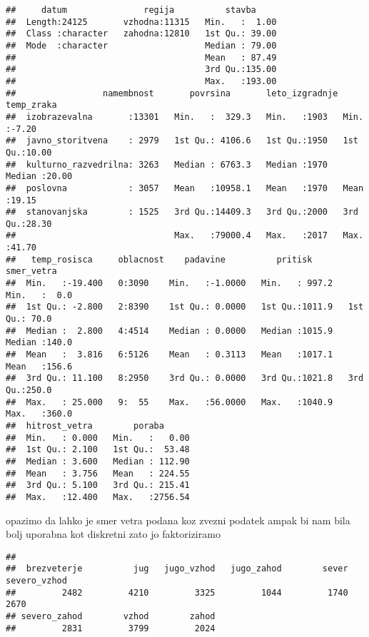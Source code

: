 \documentclass[
]{article}
\newenvironment{Shaded}{\begin{snugshade}}{\end{snugshade}}
\newcommand{\FunctionTok}[1]{\textcolor[rgb]{0.00,0.00,0.00}{#1}}
\newcommand{\NormalTok}[1]{#1}
\newcommand{\SpecialCharTok}[1]{\textcolor[rgb]{0.00,0.00,0.00}{#1}}
\begin{document}
\begin{verbatim}
##     datum               regija          stavba      
##  Length:24125       vzhodna:11315   Min.   :  1.00  
##  Class :character   zahodna:12810   1st Qu.: 39.00  
##  Mode  :character                   Median : 79.00  
##                                     Mean   : 87.49  
##                                     3rd Qu.:135.00  
##                                     Max.   :193.00  
##                 namembnost       povrsina       leto_izgradnje   temp_zraka   
##  izobrazevalna       :13301   Min.   :  329.3   Min.   :1903   Min.   :-7.20  
##  javno_storitvena    : 2979   1st Qu.: 4106.6   1st Qu.:1950   1st Qu.:10.00  
##  kulturno_razvedrilna: 3263   Median : 6763.3   Median :1970   Median :20.00  
##  poslovna            : 3057   Mean   :10958.1   Mean   :1970   Mean   :19.15  
##  stanovanjska        : 1525   3rd Qu.:14409.3   3rd Qu.:2000   3rd Qu.:28.30  
##                               Max.   :79000.4   Max.   :2017   Max.   :41.70  
##   temp_rosisca     oblacnost    padavine          pritisk         smer_vetra   
##  Min.   :-19.400   0:3090    Min.   :-1.0000   Min.   : 997.2   Min.   :  0.0  
##  1st Qu.: -2.800   2:8390    1st Qu.: 0.0000   1st Qu.:1011.9   1st Qu.: 70.0  
##  Median :  2.800   4:4514    Median : 0.0000   Median :1015.9   Median :140.0  
##  Mean   :  3.816   6:5126    Mean   : 0.3113   Mean   :1017.1   Mean   :156.6  
##  3rd Qu.: 11.100   8:2950    3rd Qu.: 0.0000   3rd Qu.:1021.8   3rd Qu.:250.0  
##  Max.   : 25.000   9:  55    Max.   :56.0000   Max.   :1040.9   Max.   :360.0  
##  hitrost_vetra        poraba       
##  Min.   : 0.000   Min.   :   0.00  
##  1st Qu.: 2.100   1st Qu.:  53.48  
##  Median : 3.600   Median : 112.90  
##  Mean   : 3.756   Mean   : 224.55  
##  3rd Qu.: 5.100   3rd Qu.: 215.41  
##  Max.   :12.400   Max.   :2756.54
\end{verbatim}

opazimo da lahko je smer vetra podana koz zvezni podatek ampak bi nam
bila bolj uporabna kot diskretni zato jo faktoriziramo

\begin{Shaded}
\end{Shaded}

\begin{verbatim}
## 
##  brezveterje          jug   jugo_vzhod   jugo_zahod        sever severo_vzhod 
##         2482         4210         3325         1044         1740         2670 
## severo_zahod        vzhod        zahod 
##         2831         3799         2024
\end{verbatim}
\end{document}
